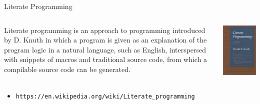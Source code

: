 \documentclass{beamer}
\begin{document}
\begin{frame}{Literate Programming}
	\begin{center}
	\begin{columns}
	\begin{block}{}
	\begin{center}
	Literate programming is an approach to programming introduced by D. Knuth in which a program is given as an explanation of the program logic in a natural language, such as English, interspersed with snippets of macros and traditional source code, from which a compilable source code can be generated.
	\end{center}
	\end{block}
	  \includegraphics[height=\linewidth]{figs/Literate_Programming_book_cover.jpg}
	\end{columns}
	\end{center}
	
      \begin{itemize}
	\item \begin{footnotesize}
	\texttt{https://en.wikipedia.org/wiki/Literate\_programming}	                                                                  \end{footnotesize}
	
      \end{itemize}
\end{frame}
\end{document}
